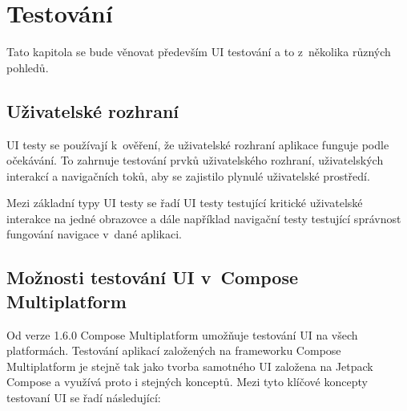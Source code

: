 \chapter{Testování} \label{testsSection}
Tato kapitola se bude věnovat především UI testování a to z~několika různých pohledů. 

\section{Uživatelské rozhraní}
UI testy se používají k~ověření, že uživatelské rozhraní aplikace funguje podle očekávání. To zahrnuje testování prvků uživatelského rozhraní, 
uživatelských interakcí a navigačních toků, aby se zajistilo plynulé uživatelské prostředí.

Mezi základní typy UI testy se řadí UI testy testující kritické uživatelské interakce na jedné obrazovce a dále například navigační testy testující
správnost fungování navigace v~dané aplikaci.







\section{Možnosti testování UI v~Compose Multiplatform}
Od verze 1.6.0 Compose Multiplatform umožňuje testování UI na všech platformách. \cite{composeNews1.6.0}
Testování aplikací založených na frameworku Compose Multiplatform je stejně tak jako tvorba samotného UI založena na Jetpack Compose a využívá 
proto i stejných konceptů. Mezi tyto klíčové koncepty testovaní UI se řadí následující:


